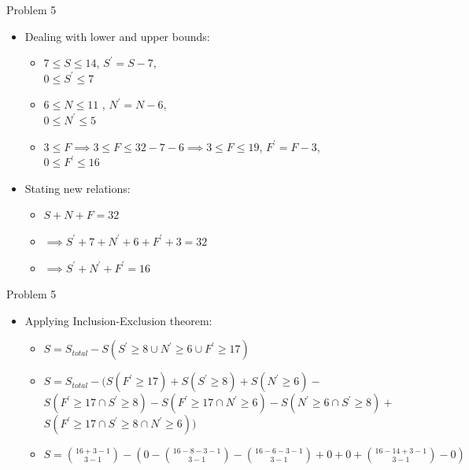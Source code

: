 \documentclass{beamer}
\begin{document}
\begin{frame}{Problem 5}
    \begin{itemize} 
        \item Dealing with lower and upper bounds:
        \begin{itemize}
            \item $7\leq S \leq14$, $S^{'}=S-7$, \\ 
                    $0\leq S^{'} \leq7$
            \item $ 6\leq N \leq 11$ , $N^{'}=N-6$, \\ 
                    $0\leq N^{'} \leq5$
            \item $3\leq F \implies 3\leq F \leq 32-7-6 \implies 3\leq F \leq 19$, $F^{'} = F - 3$, \\
                    $0 \leq F^{'} \leq 16$
        \end{itemize}
        \item Stating new relations:
        \begin{itemize}
            \item $S + N + F = 32$
            \item $\implies S^{'} + 7 + N^{'} + 6 + F^{'} + 3 = 32$
            \item $\implies S^{'} + N^{'} + F^{'} = 16$
        \end{itemize}
    \end{itemize}
\end{frame}

\begin{frame}{Problem 5}
    \begin{itemize} 
        \item Applying Inclusion-Exclusion theorem:
        \begin{itemize}
            \item $S = S_{total} - S(S^{'} \geq 8 \cup N^{'} \geq 6 \cup F^{'} \geq 17)$
            \item $S = S_{total} - (S(F^{'} \geq 17) + S(S^{'} \geq 8) + S(N^{'} \geq 6) -$ \\
                    $S(F^{'} \geq 17 \cap S^{'} \geq 8) - S(F^{'} \geq 17 \cap N^{'} \geq 6) - S(N^{'} \geq 6 \cap S^{'} \geq 8) +$ \\
                    $S(F^{'} \geq 17 \cap S^{'} \geq 8 \cap N^{'} \geq 6))$
            \item $S = {16 + 3 - 1 \choose 3 - 1} - (0 - {16 - 8 - 3 - 1 \choose 3 - 1} - {16 - 6 - 3 - 1 \choose 3 - 1} + 0 + 0 + {16 - 14 + 3 - 1 \choose 3-1} -0)$
        \end{itemize}
    \end{itemize}
\end{frame}
\end{document}
